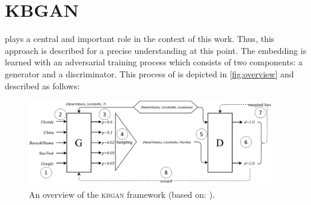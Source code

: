 \section{KBGAN} 
\label{sec:kbgan}

\kbgan plays a central and important role in the context of this work.
Thus, this approach is described for a precise understanding at this point.
The embedding is learned with an adversarial training process which consists of two components: a generator and a discriminator.
This process of \kbgan is depicted in \autoref{fig:overview} and described as follows:
\begin{figure}[t]
  \centering
    \includegraphics[width=0.95\textwidth]{figures/kbgan_original.png}
  \caption{An overview of the \textsc{kbgan} framework (based on: \cite{cai2017kbgan}).}
  \label{fig:overview}
\end{figure}

